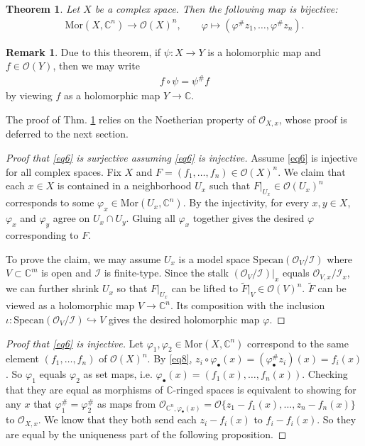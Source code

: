 \documentclass[12pt,b5paper,notitlepage]{report}
\theoremstyle{definition}
\newtheorem{rem}[df]{Remark}
\theoremstyle{plain}
\newtheorem{thm}[df]{Theorem}
\newcommand{\mc}{\mathcal}
\newcommand{\wtd}{\widetilde}
\newcommand{\scr}{\mathscr}
\newcommand{\blt}{\bullet}
\newcommand{\Cbb}{\mathbb C}
\newcommand{\Specan}{\mathrm{Specan}}
\newcommand{\Mor}{\mathrm{Mor}}
\numberwithin{equation}{section}
\begin{document}
\begin{thm}\label{lb7}
Let $X$ be a complex space. Then the following map is bijective:
\begin{gather}
\Mor(X,\Cbb^n)\rightarrow\scr O(X)^n,\qquad \varphi\mapsto (\varphi^\#z_1,\dots,\varphi^\#z_n).\label{eq6}
\end{gather}
\end{thm}











\begin{rem}\label{lb6}
Due to this theorem, if $\psi:X\rightarrow Y$ is a holomorphic map and $f\in\scr O(Y)$, then we may write
\begin{align}
f\circ\psi=\psi^\#f
\end{align}
by viewing $f$ as a holomorphic map $Y\rightarrow\Cbb$.
\end{rem}



The proof of Thm. \ref{lb7} relies on the Noetherian property of $\scr O_{X,x}$, whose proof is deferred to the next section.



\begin{proof}[Proof that \eqref{eq6} is surjective assuming \eqref{eq6} is injective]
Assume \eqref{eq6} is injective for all complex spaces. Fix $X$ and $F=(f_1,\dots,f_n)\in\scr O(X)^n$. We claim that each $x\in X$ is contained in a neighborhood $U_x$ such that $F|_{U_x}\in\scr O(U_x)^n$ corresponds to some $\varphi_x\in\Mor(U_x,\Cbb^n)$. By the injectivity, for every $x,y\in X$, $\varphi_x$ and $\varphi_y$ agree on $U_x\cap U_y$. Gluing all $\varphi_x$ together gives the desired $\varphi$ corresponding to $F$.

To prove the claim, we may assume $U_x$ is a model space $\Specan(\scr O_V/\mc I)$ where $V\subset\Cbb^m$ is open and $\mc I$ is finite-type. Since the stalk $(\scr O_V/\mc I)|_x$ equals $\scr O_{V,x}/\mc I_x$, we can further shrink $U_x$ so that $F|_{U_x}$ can be lifted to $\wtd F|_V\in\scr O(V)^n$. $\wtd F$ can be viewed as a holomorphic map $V\rightarrow\Cbb^n$. Its composition with the inclusion $\iota:\Specan(\scr O_V/\mc I)\hookrightarrow V$ gives the desired holomorphic map $\varphi$.
\end{proof}


\begin{proof}[Proof that \eqref{eq6} is injective]
Let $\varphi_1,\varphi_2\in\Mor(X,\Cbb^n)$ correspond to the same element $(f_1,\dots,f_n)$ of $\scr O(X)^n$. By \eqref{eq8}, $z_i\circ\varphi_\blt(x)=(\varphi_\blt^\# z_i)(x)=f_i(x)$. So $\varphi_1$ equals $\varphi_2$ as set maps, i.e. $\varphi_\blt(x)=(f_1(x),\dots,f_n(x))$. Checking that they are equal as morphisms of $\Cbb$-ringed spaces is equivalent to showing for any $x$ that $\varphi_1^\#=\varphi_2^\#$ as maps from $\scr O_{\Cbb^n,\varphi_\blt(x)}=\scr O\{z_1-f_1(x),\dots,z_n-f_n(x)\}$ to $\scr O_{X,x}$. We know that they both send each $z_i-f_i(x)$ to $f_i-f_i(x)$. So they are equal by the uniqueness part of the following proposition.
\end{proof}
\end{document}

